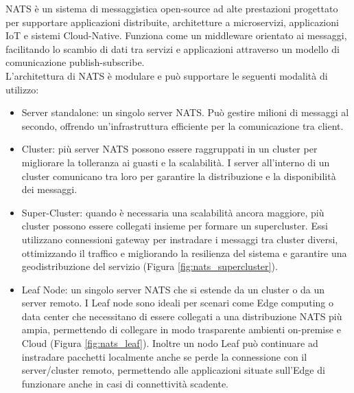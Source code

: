 NATS è un sistema di messaggistica open-source ad alte prestazioni progettato per supportare applicazioni distribuite, architetture a microservizi, applicazioni IoT e sistemi Cloud-Native. Funziona come un middleware orientato ai messaggi, facilitando lo scambio di dati tra servizi e applicazioni attraverso un modello di comunicazione publish-subscribe.\\
L'architettura di NATS è modulare e può supportare le seguenti modalità di utilizzo:
\begin{itemize}
    \item Server standalone: un singolo server NATS. Può gestire milioni di messaggi al secondo, offrendo un'infrastruttura efficiente per la comunicazione tra client.

    \item Cluster: più server NATS possono essere raggruppati in un cluster per migliorare la tolleranza ai guasti e la scalabilità. I server all'interno di un cluster comunicano tra loro per garantire la distribuzione e la disponibilità dei messaggi.

    \item Super-Cluster: quando è necessaria una scalabilità ancora maggiore, più cluster possono essere collegati insieme per formare un supercluster. Essi utilizzano connessioni gateway per instradare i messaggi tra cluster diversi, ottimizzando il traffico e migliorando la resilienza del sistema e garantire una geodistribuzione del servizio (Figura \ref{fig:nats_supercluster}).

    \item Leaf Node: un singolo server NATS che si estende da un cluster o da un server remoto. I Leaf node sono ideali per scenari come Edge computing o data center che necessitano di essere collegati a una distribuzione NATS più ampia, permettendo di collegare in modo trasparente ambienti on-premise e Cloud (Figura \ref{fig:nats_leaf}). Inoltre un nodo Leaf può continuare ad instradare pacchetti localmente anche se perde la connessione con il server/cluster remoto, permettendo alle applicazioni situate sull'Edge di funzionare anche in casi di connettività scadente.
\end{itemize}

